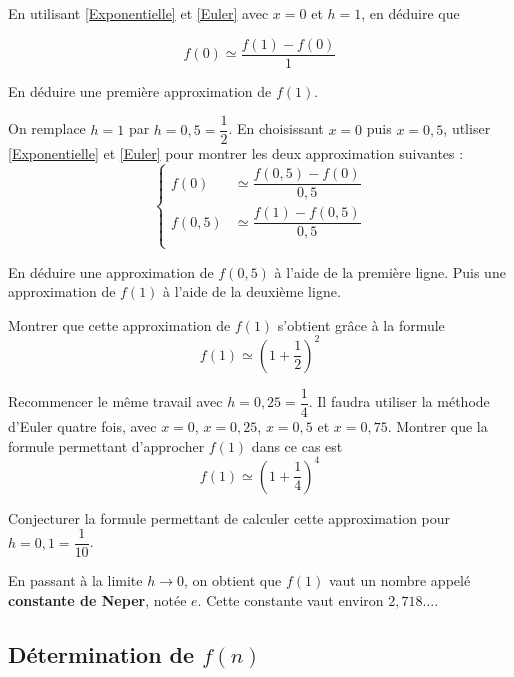 \documentclass{exos}
\begin{document}
\begin{alphaquestions}
\item En utilisant \eqref{Exponentielle} et \eqref{Euler} avec $x = 0$ et $h = 1$, en déduire que

\begin{equation*}
f(0) \simeq \dfrac{f(1) - f(0)}{1}
\end{equation*} 
\item En déduire une première approximation de $f(1)$.
\item On remplace $h = 1$ par $h = 0,5 = \dfrac{1}{2}$. En choisissant $x = 0$ puis $x = 0,5$, utliser \eqref{Exponentielle} et \eqref{Euler} pour montrer les deux approximation suivantes :
\begin{equation*}
\begin{cases}
f(0) &\simeq \dfrac{f(0,5) - f(0)}{0,5}\\
f(0,5) &\simeq \dfrac{f(1) - f(0,5)}{0,5}\\
\end{cases}  
\end{equation*}
\item En déduire une approximation de $f(0,5)$ à l'aide de la première ligne. Puis une approximation de $f(1)$ à l'aide de la deuxième ligne.
\item Montrer que cette approximation de $f(1)$ s'obtient grâce à la formule
\begin{equation*}
f(1) \simeq \left(1 + \dfrac{1}{2}\right)^2
\end{equation*} 
\item Recommencer le même travail avec $h = 0,25 = \dfrac{1}{4}$. Il faudra utiliser la méthode d'Euler quatre fois, avec $x = 0$, $x = 0,25$, $x = 0,5$ et $x = 0,75$. Montrer que la formule permettant d'approcher $f(1)$ dans ce cas est
\begin{equation*}
f(1) \simeq \left(1 + \dfrac{1}{4}\right)^4
\end{equation*}
\item Conjecturer la formule permettant de calculer cette approximation pour $h = 0,1 = \dfrac{1}{10}$.

En passant à la limite $h \to 0$, on obtient que $f(1)$ vaut un nombre appelé \textbf{constante de Neper}, notée $e$. Cette constante vaut environ $2,718\dots$.

\subsection{Détermination de $f(n)$}


\end{alphaquestions}
\end{document}
